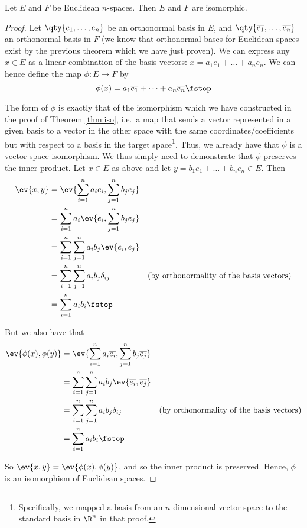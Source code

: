 \begin{theorem}
  Let \( E \) and \( F \) be Euclidean \( n \)-spaces. Then \( E \) and \( F \) are isomorphic.
\end{theorem}
\begin{proof}
  Let \( \qty{e_1,\dots,e_n} \) be an orthonormal basis in \( E \), and \( \qty{\overline{e_1},\dots,\overline{e_n}} \) an orthonormal basis in \( F \) (we know that orthonormal bases for Euclidean spaces exist by the previous theorem which we have just proven). We can express any \( x\in E \) as a linear combination of the basis vectors: \( x=a_1e_1+\dots+a_ne_n \). We can hence define the map \( \phi:E\to F \) by
  \[ \phi(x)=a_1\overline{e_1}+\dots+a_n\overline{e_n}\fstop \]
  
  The form of \( \phi \) is exactly that of the isomorphism which we have constructed in the proof of Theorem \ref{thm:iso}, i.e.\ a map that sends a vector represented in a given basis to a vector in the other space with the same coordinates/coefficients but with respect to a basis in the target space\footnote{Specifically, we mapped a basis from an \( n \)-dimensional vector space to the standard basis in \( \R^n \) in that proof.}. Thus, we already have that \( \phi \) is a vector space isomorphism. We thus simply need to demonstrate that \( \phi \) preserves the inner product. Let \( x\in E \) as above and let \( y=b_1e_1+\dots+b_ne_n\in E \). Then
  \begin{align*}
    \ev{x,y}&= \ev{\sum_{i=1}^na_ie_i,\sum_{j=1}^nb_je_j}\\
    &= \sum_{i=1}^na_i\ev{e_i,\sum_{j=1}^nb_je_j}\\
    &= \sum_{i=1}^n\sum_{j=1}^na_ib_j\ev{e_i,e_j}\\
    &= \sum_{i=1}^n\sum_{j=1}^na_ib_j\delta_{ij}&(\text{by orthonormality of the basis vectors})\\
    &= \sum_{i=1}^na_ib_i\fstop
  \end{align*}

  But we also have that
  \begin{align*}
    \ev{\phi(x),\phi(y)}&= \ev{\sum_{i=1}^na_i\overline{e_i},\sum_{j=1}^nb_j\overline{e_j}}\\
    &= \sum_{i=1}^n\sum_{j=1}^na_ib_j\ev{\overline{e_i},\overline{e_j}}\\
    &= \sum_{i=1}^n\sum_{j=1}^na_ib_j\delta_{ij}&(\text{by orthonormality of the basis vectors})\\
    &= \sum_{i=1}^na_ib_i\fstop
  \end{align*}

  So \( \ev{x,y}=\ev{\phi(x),\phi(y)} \), and so the inner product is preserved. Hence, \( \phi \) is an isomorphism of Euclidean spaces.
\end{proof}

